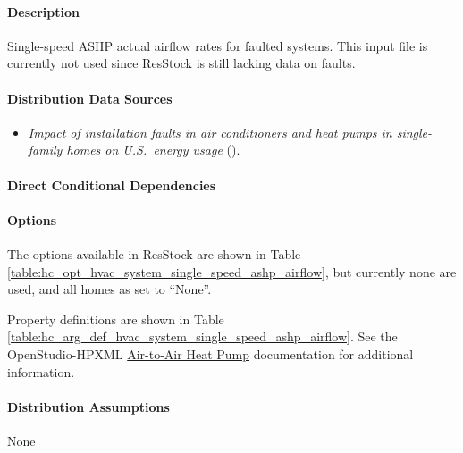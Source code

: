 \paragraph{Description}
% 
Single-speed ASHP actual airflow rates for faulted systems. This input file is currently not used since ResStock is still lacking data on faults. 

\paragraph{Distribution Data Sources}
% 
\begin{itemize}
\item 

\textit{Impact of installation faults in air conditioners and heat pumps in single-family homes on U.S.~energy usage} (\cite{Winkler2020}). 

\end{itemize}

\paragraph{Direct Conditional Dependencies}


\paragraph{Options}
The options available in ResStock are shown in Table \ref{table:hc_opt_hvac_system_single_speed_ashp_airflow}, but currently none are used, and all homes as set to ``None''.



Property definitions are shown in Table \ref{table:hc_arg_def_hvac_system_single_speed_ashp_airflow}. See the OpenStudio-HPXML \href{https://openstudio-hpxml.readthedocs.io/en/v1.10.0/workflow_inputs.html#air-to-air-heat-pump}{Air-to-Air Heat Pump} documentation for additional information.



\paragraph{Distribution Assumptions}
% 
None
